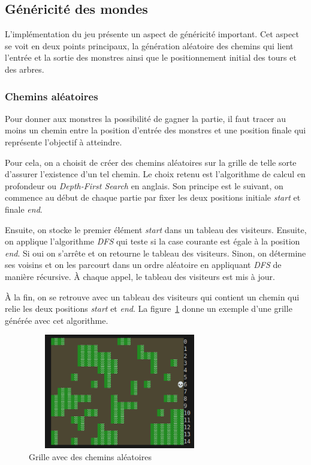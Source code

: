 \documentclass[11pt]{article}
\begin{document}
        \subsection{Généricité des mondes}
            L'implémentation du jeu présente un aspect de généricité important. Cet aspect se voit en deux points principaux, la génération aléatoire des chemins qui lient l'entrée et la sortie des monstres ainsi que le positionnement initial des tours et des arbres. 
            \subsubsection{Chemins aléatoires}
           Pour donner aux monstres la possibilité de gagner la partie, il faut tracer au moins un chemin entre la position d’entrée des monstres et une position finale qui représente l’objectif à atteindre. 
           
           Pour cela, on a choisit de créer des chemins aléatoires sur la grille de telle sorte d'assurer l'existence d'un tel chemin. Le choix retenu est l’algorithme de calcul en profondeur ou \textit{Depth-First Search} en anglais. Son principe est le suivant, on commence au début de chaque partie par fixer les deux positions initiale \textit{start} et finale \textit{end}. 
           
           Ensuite, on stocke le premier élément \textit{start}  dans un tableau des visiteurs. Ensuite, on applique l’algorithme \textit{DFS} qui teste si la case courante est égale à la position \textit{end}. Si oui on s'arrête et on retourne le tableau des visiteurs. Sinon, on détermine ses voisins et on les parcourt dans un ordre aléatoire en appliquant \textit{DFS} de manière récursive. À chaque appel, le tableau des visiteurs est mis à jour. 
           
           À la fin, on se retrouve avec un tableau des visiteurs qui contient un chemin qui relie les deux positions \textit{start} et \textit{end}. La figure~\ref{fig RandomRoad } donne un exemple d'une grille générée avec cet algorithme.
           \begin{figure}[h]
                \centering
                \includegraphics[height = 5cm, width = 8cm]{RandomRoad.png}
                \caption{Grille avec des chemins aléatoires} 
                \label{fig RandomRoad } 
            \end{figure}
\end{document}
